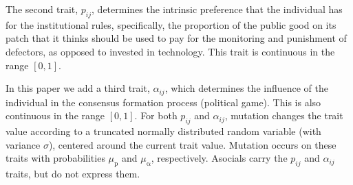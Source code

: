 \documentclass{rstb}
\begin{document}
\begin{linenumbers}
The second trait, $p_{ij}$, determines the intrinsic preference that the individual has for the institutional rules, specifically, the proportion of the public good on its patch that it thinks should be used to pay for the monitoring and punishment of defectors, as opposed to invested in technology. This trait is continuous in the range $[0,1]$. 

In this paper we add a third trait, $\alpha_{ij}$, which determines the influence of the individual in the consensus formation process (political game). This is also continuous in the range $[0,1]$. For both $p_{ij}$ and $\alpha_{ij}$, mutation changes the trait value according to a truncated normally distributed random variable (with variance $\sigma$), centered around the current trait value. Mutation occurs on these traits with probabilities $\mu_\mathrm{p}$ and $\mu_\mathrm{\alpha}$, respectively. Asocials carry the $p_{ij}$ and  $\alpha_{ij}$ traits, but do not express them. 


\end{linenumbers}
\end{document}
